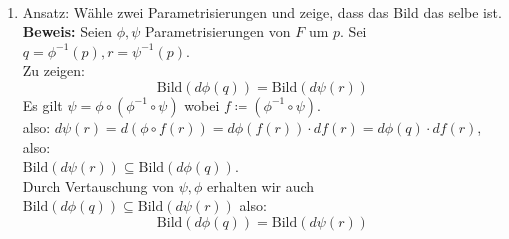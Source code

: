 \begin{solution}
  \
  \begin{enumerate}[label= (\alph*)]
    \item Ansatz: Wähle zwei Parametrisierungen und zeige, dass das Bild das selbe ist. \\
    \textbf{Beweis:} Seien \( \phi, \psi \) Parametrisierungen von \( F \) um \( p \). Sei \( q=\phi^{-1}(p), r=\psi^{-1}(p). \) \\
    Zu zeigen:
    \begin{equation*}
      \text{Bild}(d \phi(q)) = \text{Bild}(d \psi(r))
    \end{equation*}
    Es gilt \( \psi = \phi \circ (\phi^{-1} \circ \psi) \) wobei \( f \coloneqq (\phi^{-1} \circ \psi) \). \\
    also: \( d \psi(r) = d (\phi \circ f(r)) = d \phi(f(r)) \cdot df(r) = d \phi(q) \cdot df(r) \), also: \\
    \( \text{Bild}(d \psi(r)) \subseteq \text{Bild}(d\phi(q)) \). \\
    Durch Vertauschung von \( \psi ,\phi \) erhalten wir auch \( \text{Bild}(d\phi(q)) \subseteq \text{Bild}(d \psi(r)) \) also: 
    \begin{equation*}
      \text{Bild}(d\phi(q)) = \text{Bild}(d \psi(r))
    \end{equation*}
    

\end{enumerate}
\end{solution}
